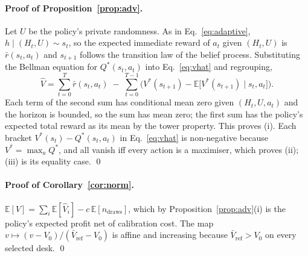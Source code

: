 \documentclass[10pt]{article}
\theoremstyle{definition}
\theoremstyle{remark}
\theoremstyle{plain}
\newcommand{\E}{\mathbb{E}}
\begin{document}
\paragraph{Proof of Proposition~\ref{prop:adv}.}
Let $U$ be the policy's private randomness. As in Eq.~\eqref{eq:adaptive},
$h\mid(H_t,U)\sim s_t$, so the expected immediate reward of $a_t$ given $(H_t,U)$ is
$\bar r(s_t,a_t)$ and $s_{t+1}$ follows the transition law of the belief process. Substituting the
Bellman equation for $Q^{*}(s_t,a_t)$ into Eq.~\eqref{eq:vhat} and regrouping,
\[
\hat V=\sum_{t=0}^{T}\bar r(s_t,a_t)\;-\;\sum_{t=0}^{T-1}\Big(V^{*}(s_{t+1})-\E\big[V^{*}(s_{t+1})\mid
s_t,a_t\big]\Big).
\]
Each term of the second sum has conditional mean zero given $(H_t,U,a_t)$ and the horizon is
bounded, so the sum has mean zero; the first sum has the policy's expected total reward as its mean
by the tower property. This proves (i). Each bracket $V^{*}(s_t)-Q^{*}(s_t,a_t)$ in
Eq.~\eqref{eq:vhat} is non-negative because $V^{*}=\max_aQ^{*}$, and all vanish iff every action is
a maximiser, which proves (ii); (iii) is its equality case. \qed

\paragraph{Proof of Corollary~\ref{cor:norm}.}
$\E[V]=\sum_i\E[\hat V_i]-c\,\E[n_\mathrm{draws}]$, which by Proposition~\ref{prop:adv}(i) is the
policy's expected profit net of calibration cost. The map $v\mapsto(v-V_0)/(\bar V_\mathrm{ref}-V_0)$
is affine and increasing because $\bar V_\mathrm{ref}>V_0$ on every selected desk. \qed
\end{document}
